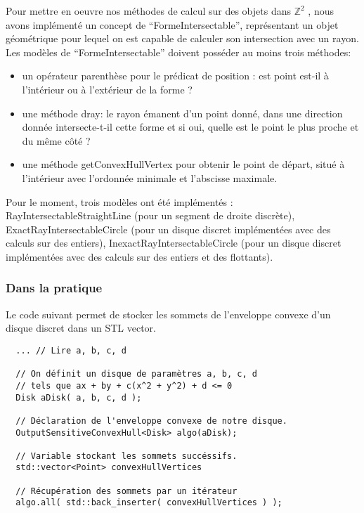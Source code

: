 Pour mettre en oeuvre nos méthodes de calcul sur des objets dans $\mathbb{Z}^{2}$ , nous avons implémenté un concept de ``FormeIntersectable'', 
représentant un objet géométrique pour lequel on est capable de calculer son intersection avec un rayon. Les modèles de ``FormeIntersectable''
doivent posséder au moins trois méthodes: 

\begin{itemize}
  \item un opérateur parenthèse pour le prédicat de position : est point est-il à l'intérieur ou à l'extérieur de la forme ?
  \item une méthode dray: le rayon émanent d'un point donné, dans une direction donnée intersecte-t-il cette forme et si oui, quelle est le point le plus proche et du même côté ?
  \item une méthode getConvexHullVertex pour obtenir le point de départ, situé à l'intérieur avec l'ordonnée minimale et l'abscisse maximale. 
\end{itemize}

Pour le moment, trois modèles ont été implémentés : RayIntersectableStraightLine (pour un segment de droite discrète), ExactRayIntersectableCircle (pour un disque discret implémentées avec des calculs sur des entiers), InexactRayIntersectableCircle (pour un disque discret implémentées avec des calculs sur des entiers et des flottants).


\subsubsection{Dans la pratique}

Le code suivant permet de stocker les sommets de l'enveloppe convexe
d'un disque discret dans un STL vector. 

\begin{verbatim}
  ... // Lire a, b, c, d

  // On définit un disque de paramètres a, b, c, d
  // tels que ax + by + c(x^2 + y^2) + d <= 0
  Disk aDisk( a, b, c, d );	 
  
  // Déclaration de l'enveloppe convexe de notre disque.
  OutputSensitiveConvexHull<Disk> algo(aDisk);
  
  // Variable stockant les sommets succéssifs.
  std::vector<Point> convexHullVertices
  
  // Récupération des sommets par un itérateur 
  algo.all( std::back_inserter( convexHullVertices ) );  
\end{verbatim}

